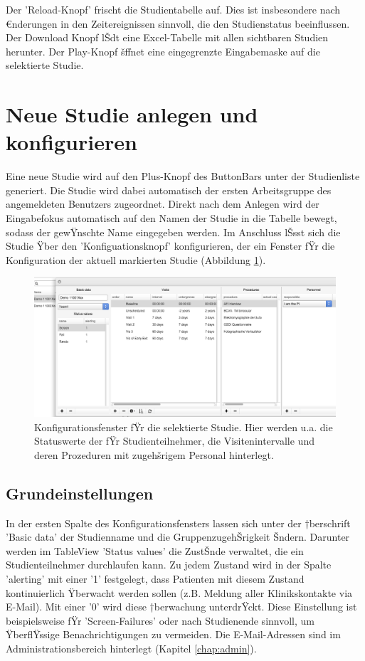 \documentclass[11pt,oneside]{scrbook}
\begin{document}
Der 'Reload-Knopf' frischt die Studientabelle auf. Dies ist insbesondere nach €nderungen in den Zeitereignissen sinnvoll, die den Studienstatus beeinflussen. Der Download Knopf lŠdt eine Excel-Tabelle mit allen sichtbaren Studien herunter. Der Play-Knopf šffnet eine eingegrenzte Eingabemaske auf die selektierte Studie.

\section{Neue Studie anlegen und konfigurieren}
Eine neue Studie wird auf den Plus-Knopf des ButtonBars unter der Studienliste generiert. Die Studie wird dabei automatisch der ersten Arbeitsgruppe des angemeldeten Benutzers zugeordnet. Direkt nach dem Anlegen wird  der Eingabefokus automatisch auf den Namen der Studie in die  Tabelle bewegt, sodass der gewŸnschte Name eingegeben werden. Im Anschluss lŠsst sich die Studie Ÿber den 'Konfiguationsknopf'  konfigurieren, der ein Fenster fŸr die Konfiguration der aktuell markierten Studie (Abbildung \ref{fig:config}).

\begin{figure}[htbp]
\begin{center}
\includegraphics[scale=0.34]{figs/config.png}
\caption{Konfigurationsfenster fŸr die  selektierte Studie. Hier werden u.a. die Statuswerte der fŸr Studienteilnehmer, die Visitenintervalle und deren Prozeduren mit zugehšrigem Personal hinterlegt.}
\label{fig:config}
\end{center}
\end{figure}

\subsection{Grundeinstellungen}
\label{chap:config}
In der ersten Spalte des Konfigurationsfensters lassen sich unter der †berschrift 'Basic data' der Studienname und die GruppenzugehŠrigkeit Šndern. Darunter werden im TableView 'Status values' die ZustŠnde verwaltet, die ein Studienteilnehmer durchlaufen kann. Zu jedem Zustand wird in der Spalte 'alerting' mit einer '1' festgelegt, dass Patienten mit diesem Zustand  kontinuierlich Ÿberwacht werden sollen (z.B. Meldung aller Klinikskontakte via E-Mail). Mit einer '0' wird diese †berwachung unterdrŸckt. Diese Einstellung ist beispielsweise fŸr 'Screen-Failures' oder nach Studienende sinnvoll, um ŸberflŸssige Benachrichtigungen zu vermeiden. Die  E-Mail-Adressen sind im Administrationsbereich hinterlegt (Kapitel \ref{chap:admin}).
\end{document}
